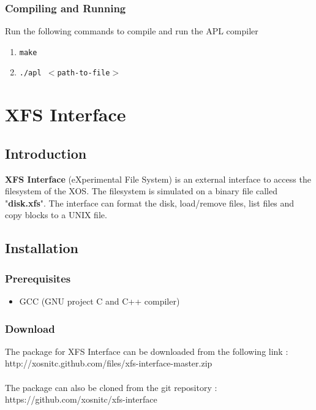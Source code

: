 \documentclass[11pt]{report}
\begin{document}
\subsection{Compiling and Running}
Run the following commands to compile and run the APL compiler
\begin{enumerate}
		\item \texttt{make}
		\item \texttt{./apl $<$path-to-file$>$ }
\end{enumerate}



\chapter{XFS Interface}

\section{Introduction}
\textbf{XFS Interface} (eXperimental File System) is an external interface to access the filesystem of the XOS. The filesystem is simulated on a binary file called "\textbf{disk.xfs}". The interface can format the disk, load/remove files, list files and copy blocks to a UNIX file.

\section{Installation}
\subsection{Prerequisites}
\begin{itemize}
	\item GCC (GNU project C and C++ compiler)
\end{itemize}

\subsection{Download}

The package for XFS Interface can be downloaded from the following link :\\
http://xosnitc.github.com/files/xfs-interface-master.zip \\ \\
The package can also be cloned from the git repository : \\
https://github.com/xosnitc/xfs-interface
\end{document}
